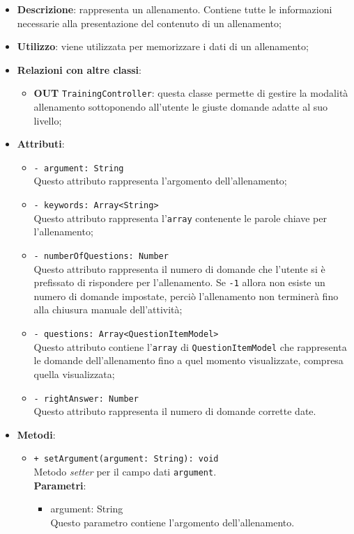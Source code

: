 		\begin{itemize}
			\item \textbf{Descrizione}: rappresenta un allenamento. Contiene tutte le informazioni necessarie alla	presentazione del contenuto di un allenamento;
			\item \textbf{Utilizzo}: viene utilizzata per memorizzare i dati di un allenamento;
			\item \textbf{Relazioni con altre classi}: 
			\begin{itemize}
				\item \textbf{OUT} \texttt{TrainingController}: questa classe permette di gestire la modalità allenamento sottoponendo all'utente le giuste domande adatte al suo livello;
			\end{itemize}
			\item \textbf{Attributi}: 
			\begin{itemize}
				\item \texttt{- argument: String}\\
				Questo attributo rappresenta l'argomento dell'allenamento;
				\item \texttt{- keywords: Array<String>}\\
				Questo attributo rappresenta l'\texttt{array} contenente le parole chiave per l'allenamento;
				\item \texttt{- numberOfQuestions: Number}\\
				Questo attributo rappresenta il numero di domande che l'utente si è prefissato di rispondere per l'allenamento. Se \texttt{-1} allora non esiste un numero di domande impostate, perciò l'allenamento non terminerà fino alla chiusura manuale dell'attività;
				\item \texttt{- questions: Array<QuestionItemModel>}\\
				Questo attributo contiene l'\texttt{array} di \texttt{QuestionItemModel} che rappresenta le domande dell'allenamento fino a quel momento visualizzate, compresa quella visualizzata;
				\item \texttt{- rightAnswer: Number}\\
				Questo attributo rappresenta il numero di domande corrette date.
			\end{itemize}
			\item \textbf{Metodi}: 
			\begin{itemize}
				\item \texttt{+ setArgument(argument: String): void} \\
				Metodo \textit{setter} per il campo dati \texttt{argument}.\\
				\textbf{Parametri}:
				\begin{itemize}
					\item {argument: String}\\
					Questo parametro contiene l'argomento dell'allenamento.
				\end{itemize}
				

\end{itemize}
\end{itemize}
